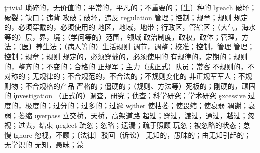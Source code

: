\begin{multicols}{2}
\c{trivial}  \a 琐碎的，无价值的；平常的，平凡的；不重要的；〔生〕种的
\c{breach}  \n 破坏；破裂；缺口；违背 \vt 攻破；破坏，违反
\c{regulation}  \n 管理；控制；规章；规则 \a 规定的，必须穿戴的，必须使用的
  \n 地区，地域，地带；行政区，管辖区；（大气，海水等的）层，界，境；（学问等的）范围，领域
  \n 政治制度，政权，政体；管理，方法；〔医〕养生法；（病人等的）生活规则
  \vt 调节，调整；校准；控制，管理
  \n 管理；控制；规章；规则 \a 规定的，必须穿戴的，必须使用的
  \a 有规律的，定期的；规则的，整齐的；不变的；合格的 \n 正规军；主力（或正式）队员；常客
  \a 不规则的，不对称的；无规律的；不合规范的，不合法的；不规则变化的 \n 非正规军军人；不规则物；不合规格的产品
  \a 严格的；僵硬的；（规则、方法等）死板的；刚硬的，顽固的
\c{investigation}  \n （正式的）调查，研究；侦查；科学研究；学术研究 
\c{excessive}  \a 过度的，极度的；过分的；过多的；过逾
\c{wither}  \vt 使枯萎；使畏缩；使衰弱 \vi 凋谢；衰弱；萎缩
\c{overpass}  \n 立交桥，天桥，高架道路 \v 超过；穿过，渡过，通过，越过；忽视；过去，结束
\c{neglect}  \vt 疏忽；忽略；遗漏；疏于照顾 \n 玩忽；被忽略的状态；怠慢
\c{ignore}  \vt 忽视，不顾；〔法律〕驳回（诉讼）
  \a 无知的，愚昧的；由无知引起的；无学识的
  \n 无知，愚昧；蒙


\end{multicols}
